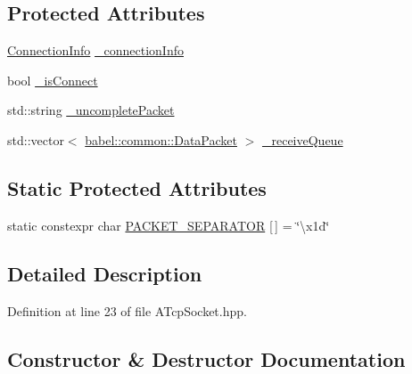 \subsection*{Protected Attributes}
\begin{DoxyCompactItemize}
\item 
\mbox{\hyperlink{classbabel_1_1common_1_1_connection_info}{Connection\+Info}} \mbox{\hyperlink{classbabel_1_1common_1_1_a_tcp_socket_a7da9857439a1ec09a294f836fc7f4953}{\+\_\+connection\+Info}}
\item 
bool \mbox{\hyperlink{classbabel_1_1common_1_1_a_tcp_socket_a3c81c4d172cd2d40a3420adb91198c44}{\+\_\+is\+Connect}}
\item 
std\+::string \mbox{\hyperlink{classbabel_1_1common_1_1_a_tcp_socket_a9a4028cf3901dce3a0521dcf95261c84}{\+\_\+uncomplete\+Packet}}
\item 
std\+::vector$<$ \mbox{\hyperlink{classbabel_1_1common_1_1_data_packet}{babel\+::common\+::\+Data\+Packet}} $>$ \mbox{\hyperlink{classbabel_1_1common_1_1_a_tcp_socket_a4aa705ce6c0507c6a59137e8c42a4f20}{\+\_\+receive\+Queue}}
\end{DoxyCompactItemize}
\subsection*{Static Protected Attributes}
\begin{DoxyCompactItemize}
\item 
static constexpr char \mbox{\hyperlink{classbabel_1_1common_1_1_a_tcp_socket_a078160df0f68925ab42586e86f0b9bd4}{P\+A\+C\+K\+E\+T\+\_\+\+S\+E\+P\+A\+R\+A\+T\+OR}} \mbox{[}$\,$\mbox{]} = \char`\"{}\textbackslash{}x1d\char`\"{}
\end{DoxyCompactItemize}


\subsection{Detailed Description}


Definition at line 23 of file A\+Tcp\+Socket.\+hpp.



\subsection{Constructor \& Destructor Documentation}
\mbox{\label{classbabel_1_1common_1_1_a_tcp_socket_afc97013cfafa24251d58cd82c39cb716}} 
